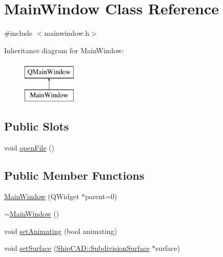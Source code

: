 \hypertarget{classMainWindow}{\section{Main\-Window Class Reference}
\label{classMainWindow}
}


{\ttfamily \#include $<$mainwindow.\-h$>$}

Inheritance diagram for Main\-Window\-:\begin{figure}[H]
\begin{center}
\leavevmode
\includegraphics[height=2.000000cm]{classMainWindow}
\end{center}
\end{figure}
\subsection*{Public Slots}
\begin{DoxyCompactItemize}
\item 
void \hyperlink{classMainWindow_a288b768c3c21a9171bdc56fe845ece8b}{open\-File} ()
\end{DoxyCompactItemize}
\subsection*{Public Member Functions}
\begin{DoxyCompactItemize}
\item 
\hyperlink{classMainWindow_a8b244be8b7b7db1b08de2a2acb9409db}{Main\-Window} (Q\-Widget $\ast$parent=0)
\item 
\hyperlink{classMainWindow_ae98d00a93bc118200eeef9f9bba1dba7}{$\sim$\-Main\-Window} ()
\item 
void \hyperlink{classMainWindow_ae53d70703200d86162a68a9a8ba593ee}{set\-Animating} (bool animating)
\item 
void \hyperlink{classMainWindow_a09cb0428e2c3a4226c04eafff3904f5d}{set\-Surface} (\hyperlink{classShipCAD_1_1SubdivisionSurface}{Ship\-C\-A\-D\-::\-Subdivision\-Surface} $\ast$surface)
\end{DoxyCompactItemize}
